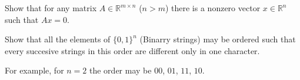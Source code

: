 \documentclass[addpoints]{exam}
\begin{document}
  \pagestyle{headandfoot}
  \runningheadrule

  \firstpagefooter{}{}{}
  \runningfooter{}{}{}
  \begin{flushright}

    \vspace{0.2in}
  \end{flushright}

  \begin{questions}
    \question
      Show that for any matrix $A \in \mathbb{R}^{m \times n}$ ($n > m$) there is a
			nonzero vector $x \in \mathbb{R}^n$ such that $Ax = 0$.

      \begin{solution}[\stretch{1}]
      \end{solution}
      \newpage
    \question
      Show that all the elements of $\{0, 1\}^n$ (Binarry strings) may be ordered
			such that every succesive strings in this order are different only in one
			character.
			
			For example, for $n = 2$ the order may be $00$, $01$, $11$, $10$.

      \begin{solution}[\stretch{1}]
      \end{solution}
      \newpage
  \end{questions}
\end{document}
